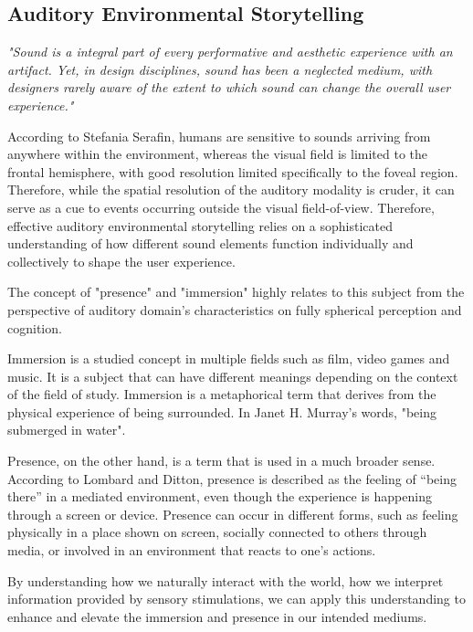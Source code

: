         \subsection{Auditory Environmental Storytelling}
            \emph{"Sound is a integral part of every performative and aesthetic experience with an artifact. Yet, in design disciplines, sound has been a neglected medium, with designers rarely aware of the extent to which sound can change the overall user experience."\cite{Sonic_Interaction_Design}}

            According to Stefania Serafin, humans are sensitive to sounds arriving from anywhere within the environment, whereas the visual field is limited to the frontal hemisphere, with good resolution limited specifically to the foveal region. Therefore, while the spatial resolution of the auditory modality is cruder, it can serve as a cue to events occurring outside the visual field-of-view\cite{Sonic_Interaction_in_Virtual_Environments}. Therefore, effective auditory environmental storytelling relies on a sophisticated understanding of how different sound elements function individually and collectively to shape the user experience.\par

            The concept of "presence" and "immersion" highly relates to this subject from the perspective of auditory domain's characteristics on fully spherical perception and cognition.\par

            Immersion is a studied concept in multiple fields such as film, video games and music. It is a subject that can have different meanings depending on the context of the field of study\cite{Sonic_Interaction_in_Virtual_Environments}. Immersion is a metaphorical term that derives from the physical experience of being surrounded. In Janet H. Murray's words, "being submerged in water"\cite{Hamlet_on_the_Holodeck}. 

            Presence, on the other hand, is a term that is used in a much broader sense. According to Lombard and Ditton, presence is described as the feeling of “being there” in a mediated environment, even though the experience is happening through a screen or device. Presence can occur in different forms, such as feeling physically in a place shown on screen, socially connected to others through media, or involved in an environment that reacts to one’s actions\cite{Concept_of_Presence}.

            By understanding how we naturally interact with the world, how we interpret information provided by sensory stimulations, we can apply this understanding to enhance and elevate the immersion and presence in our intended mediums.\par

